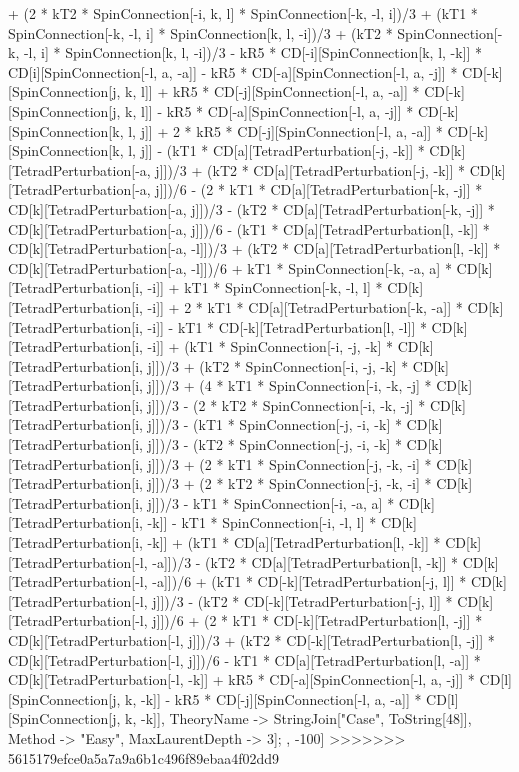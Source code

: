 + (2 * kT2 * SpinConnection[-i, k, l] * SpinConnection[-k, -l, i])/3 + (kT1 * SpinConnection[-k, -l, i] * SpinConnection[k, l, -i])/3 + (kT2 * SpinConnection[-k, -l, i] * SpinConnection[k, l, -i])/3 - kR5 * CD[-i][SpinConnection[k, l, -k]] * CD[i][SpinConnection[-l, a, -a]] - kR5 * CD[-a][SpinConnection[-l, a, -j]] * CD[-k][SpinConnection[j, k, l]] + kR5 * CD[-j][SpinConnection[-l, a, -a]] * CD[-k][SpinConnection[j, k, l]] - kR5 * CD[-a][SpinConnection[-l, a, -j]] * CD[-k][SpinConnection[k, l, j]] + 2 * kR5 * CD[-j][SpinConnection[-l, a, -a]] * CD[-k][SpinConnection[k, l, j]] - (kT1 * CD[a][TetradPerturbation[-j, -k]] * CD[k][TetradPerturbation[-a, j]])/3 + (kT2 * CD[a][TetradPerturbation[-j, -k]] * CD[k][TetradPerturbation[-a, j]])/6 - (2 * kT1 * CD[a][TetradPerturbation[-k, -j]] * CD[k][TetradPerturbation[-a, j]])/3 - (kT2 * CD[a][TetradPerturbation[-k, -j]] * CD[k][TetradPerturbation[-a, j]])/6 - (kT1 * CD[a][TetradPerturbation[l, -k]] * CD[k][TetradPerturbation[-a, -l]])/3 + (kT2 * CD[a][TetradPerturbation[l, -k]] * CD[k][TetradPerturbation[-a, -l]])/6 + kT1 * SpinConnection[-k, -a, a] * CD[k][TetradPerturbation[i, -i]] + kT1 * SpinConnection[-k, -l, l] * CD[k][TetradPerturbation[i, -i]] + 2 * kT1 * CD[a][TetradPerturbation[-k, -a]] * CD[k][TetradPerturbation[i, -i]] - kT1 * CD[-k][TetradPerturbation[l, -l]] * CD[k][TetradPerturbation[i, -i]] + (kT1 * SpinConnection[-i, -j, -k] * CD[k][TetradPerturbation[i, j]])/3 + (kT2 * SpinConnection[-i, -j, -k] * CD[k][TetradPerturbation[i, j]])/3 + (4 * kT1 * SpinConnection[-i, -k, -j] * CD[k][TetradPerturbation[i, j]])/3 - (2 * kT2 * SpinConnection[-i, -k, -j] * CD[k][TetradPerturbation[i, j]])/3 - (kT1 * SpinConnection[-j, -i, -k] * CD[k][TetradPerturbation[i, j]])/3 - (kT2 * SpinConnection[-j, -i, -k] * CD[k][TetradPerturbation[i, j]])/3 + (2 * kT1 * SpinConnection[-j, -k, -i] * CD[k][TetradPerturbation[i, j]])/3 + (2 * kT2 * SpinConnection[-j, -k, -i] * CD[k][TetradPerturbation[i, j]])/3 - kT1 * SpinConnection[-i, -a, a] * CD[k][TetradPerturbation[i, -k]] - kT1 * SpinConnection[-i, -l, l] * CD[k][TetradPerturbation[i, -k]] + (kT1 * CD[a][TetradPerturbation[l, -k]] * CD[k][TetradPerturbation[-l, -a]])/3 - (kT2 * CD[a][TetradPerturbation[l, -k]] * CD[k][TetradPerturbation[-l, -a]])/6 + (kT1 * CD[-k][TetradPerturbation[-j, l]] * CD[k][TetradPerturbation[-l, j]])/3 - (kT2 * CD[-k][TetradPerturbation[-j, l]] * CD[k][TetradPerturbation[-l, j]])/6 + (2 * kT1 * CD[-k][TetradPerturbation[l, -j]] * CD[k][TetradPerturbation[-l, j]])/3 + (kT2 * CD[-k][TetradPerturbation[l, -j]] * CD[k][TetradPerturbation[-l, j]])/6 - kT1 * CD[a][TetradPerturbation[l, -a]] * CD[k][TetradPerturbation[-l, -k]] + kR5 * CD[-a][SpinConnection[-l, a, -j]] * CD[l][SpinConnection[j, k, -k]] - kR5 * CD[-j][SpinConnection[-l, a, -a]] * CD[l][SpinConnection[j, k, -k]], TheoryName -> StringJoin["Case", ToString[48]], Method -> "Easy", MaxLaurentDepth -> 3]; , -100]
>>>>>>> 5615179efce0a5a7a9a6b1c496f89ebaa4f02dd9
